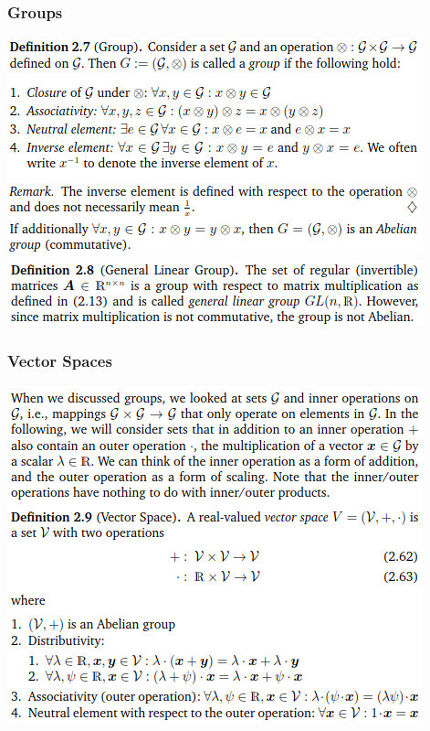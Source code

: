 \documentclass[oneside,10pt]{scrartcl}
\begin{document}
\begin{multicols*}{2}
\subsubsection*{Groups}
\includegraphics[width=\linewidth]{2.4}
\includegraphics[width=\linewidth]{2.4_1}

\subsubsection*{Vector Spaces}
\includegraphics[width=\linewidth]{2.4_2}


\end{multicols*}
\end{document}
